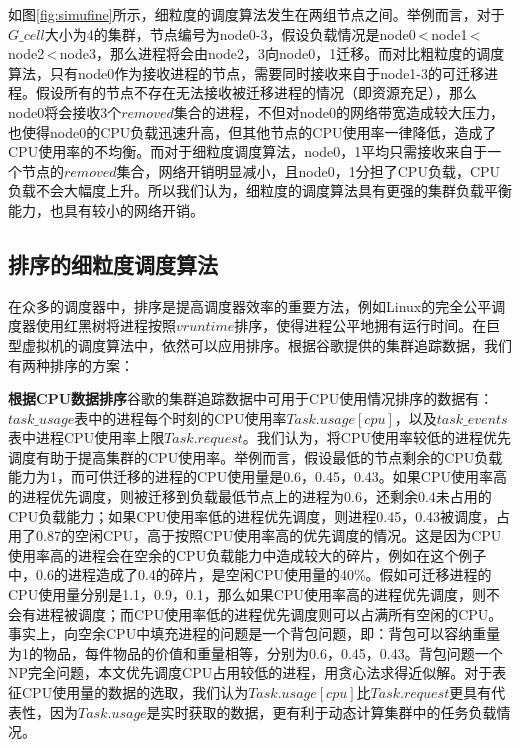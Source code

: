 如图\ref{fig:simufine}所示，细粒度的调度算法发生在两组节点之间。举例而言，对于$G\_cell$大小为4的集群，节点编号为node0-3，假设负载情况是node0\,<\,node1\,<\,node2\,<\,node3，那么进程将会由node2，3向node0，1迁移。而对比粗粒度的调度算法，只有node0作为接收进程的节点，需要同时接收来自于node1-3的可迁移进程。假设所有的节点不存在无法接收被迁移进程的情况（即资源充足），那么node0将会接收3个$removed$集合的进程，不但对node0的网络带宽造成较大压力，也使得node0的CPU负载迅速升高，但其他节点的CPU使用率一律降低，造成了CPU使用率的不均衡。而对于细粒度调度算法，node0，1平均只需接收来自于一个节点的$removed$集合，网络开销明显减小，且node0，1分担了CPU负载，CPU负载不会大幅度上升。所以我们认为，细粒度的调度算法具有更强的集群负载平衡能力，也具有较小的网络开销。

\subsection{排序的细粒度调度算法}
在众多的调度器中，排序是提高调度器效率的重要方法，例如Linux\cite{linux}的完全公平调度器使用红黑树将进程按照$vruntime$排序，使得进程公平地拥有运行时间。在巨型虚拟机的调度算法中，依然可以应用排序。根据谷歌提供的集群追踪数据，我们有两种排序的方案：

\noindent\textbf{根据CPU数据排序}\quad 谷歌的集群追踪数据中可用于CPU使用情况排序的数据有：$task\_usage$表中的进程每个时刻的CPU使用率$Task.usage[cpu]$，以及$task\_events$表中进程CPU使用率上限$Task.request$。我们认为，将CPU使用率较低的进程优先调度有助于提高集群的CPU使用率。举例而言，假设最低的节点剩余的CPU负载能力为1，而可供迁移的进程的CPU使用量是0.6，0.45，0.43。如果CPU使用率高的进程优先调度，则被迁移到负载最低节点上的进程为0.6，还剩余0.4未占用的CPU负载能力；如果CPU使用率低的进程优先调度，则进程0.45，0.43被调度，占用了0.87的空闲CPU，高于按照CPU使用率高的优先调度的情况。这是因为CPU使用率高的进程会在空余的CPU负载能力中造成较大的碎片，例如在这个例子中，0.6的进程造成了0.4的碎片，是空闲CPU使用量的40\%。假如可迁移进程的CPU使用量分别是1.1，0.9，0.1，那么如果CPU使用率高的进程优先调度，则不会有进程被调度；而CPU使用率低的进程优先调度则可以占满所有空闲的CPU。事实上，向空余CPU中填充进程的问题是一个背包问题，即：背包可以容纳重量为1的物品，每件物品的价值和重量相等，分别为0.6，0.45，0.43。背包问题一个NP完全问题，本文优先调度CPU占用较低的进程，用贪心法求得近似解。对于表征CPU使用量的数据的选取，我们认为$Task.usage[cpu]$比$Task.request$更具有代表性，因为$Task.usage$是实时获取的数据，更有利于动态计算集群中的任务负载情况。

